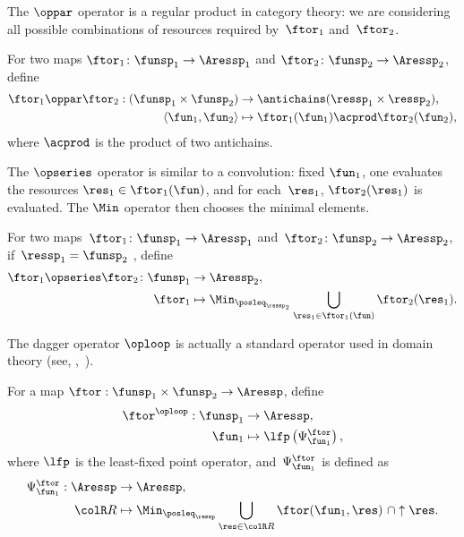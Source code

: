 The $\oppar$ operator is a regular product in category theory: we
are considering all possible combinations of resources required by~$\ftor_{1}$
and~$\ftor_{2}$.
\begin{definition}
    \label{def:opmaps}
    For two maps $\ftor_{1}\colon\funsp_{1}\rightarrow\Aressp_{1}$
    and $\ftor_{2}\colon\funsp_{2}\rightarrow\Aressp_{2}$, define
    \begin{align*}
        \ftor_{1}\oppar\ftor_{2}:(\funsp_{1}\times\funsp_{2}) & \rightarrow\antichains(\ressp_{1}\times\ressp_{2}),   \\
        \left\langle \fun_{1},\fun_{2}\right\rangle           & \mapsto\ftor_{1}(\fun_{1})\acprod\ftor_{2}(\fun_{2}),
    \end{align*}
    where $\acprod$ is the product of two antichains.
\end{definition}
The $\opseries$ operator is similar to a convolution: fixed $\fun_{1}$,
one evaluates the resources $\res_{1}\in\ftor_{1}(\fun)$, and for
each~$\res_{1}$, $\ftor_{2}(\res_{1})$ is evaluated.
The $\Min$
operator then chooses the minimal elements.
\begin{definition}
    \label{def:opseries}
    For two maps~$\ftor_{1}\colon\funsp_{1}\rightarrow\Aressp_{1}$
    and~$\ftor_{2}\colon\funsp_{2}\rightarrow\Aressp_{2}$, if~$\ressp_{1}=\funsp_{2}$
    , define
    \begin{align*}
        {\displaystyle \ftor_{1}\opseries\ftor_{2}\colon\funsp_{1}}
                  & \rightarrow\Aressp_{2},                                                                    \\
        \ftor_{1} & \mapsto\Min_{\posleq_{\ressp_{2}}}\bigcup_{\res_{1}\in\ftor_{1}(\fun)}\ftor_{2}(\res_{1}).
    \end{align*}

\end{definition}

The dagger operator $\oploop$ is actually a standard operator used
in domain theory (see, \eg ,~\cite[II-2.29]{gierz03continuous}).
\begin{definition}
    \label{def:oploop}
    For a map $\ftor:\funsp_{1}\times\funsp_{2}\rightarrow\Aressp$,
    define
    \begin{align}
        \ftor^{\oploop}:\funsp_{1} & \rightarrow\Aressp,\nonumber                     \\
        \fun_{1}                   & \mapsto\lfp\left(\Psi_{\fun_{1}}^{\ftor}\right),
    \end{align}
    where $\lfp$ is the least-fixed point operator, and~$\Psi_{\fun_{1}}^{\ftor}$
    is defined as
    \begin{align*}
        \Psi_{\fun_{1}}^{\ftor}:\Aressp & \rightarrow\Aressp,                                                                             \\
        {\colR R}                       & \mapsto\Min_{\posleq_{\ressp}}\bigcup_{\res\in{\colR R}}\ftor(\fun_{1},\res)\ \cap\uparrow\res.
    \end{align*}
\end{definition}

